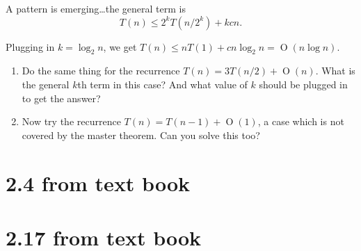 \documentclass[12pt]{article}
\newcommand{\BigO}[1]{\ensuremath{\operatorname{O}\left(#1\right)}}
\begin{document}
A pattern is emerging\ldots the general term is 
\[T(n) \leq 2^kT(n/2^k) + kcn.\]

Plugging in $k = \log_2{n}$, we get $T(n) \leq nT(1) + cn\log_2{n} = \BigO{n\log{n}}.$
\begin{enumerate}
\item Do the same thing for the recurrence $T(n) = 3T(n/2) + \BigO{n}$. What
is the general $k$th term
in this case? And what value of $k$ should be plugged in to get the
answer?

\item Now try the recurrence $T(n) = T( n −1 ) + \BigO{1}$, a case which is not
covered by the master theorem. Can you solve this too?
\end{enumerate}

\section*{2.4 from text book}

\section*{2.17 from text book}
\end{document}
